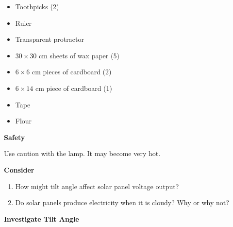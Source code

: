 \documentclass[english,twoside]{article}
\begin{document}
\begin{itemize}
	\item Toothpicks (2)
	\item Ruler	
	\item Transparent protractor
	\item $30 \times 30$ cm sheets of wax paper (5)
	\item $6 \times 6$ cm pieces of cardboard (2)
	\item $6 \times 14$ cm piece of cardboard (1)
	\item Tape
	\item Flour
\end{itemize}

\textbf{Safety}

Use caution with the lamp. It may become very hot.

\textbf{Consider}
\begin{enumerate}
	\item How might tilt angle affect solar panel voltage output?
	\answerspace{1.3in}
	\item Do solar panels produce electricity when it is cloudy? Why or why not?
	\answerspace{1.5in}
\end{enumerate}
 
\textbf{Investigate Tilt Angle}
\end{document}
